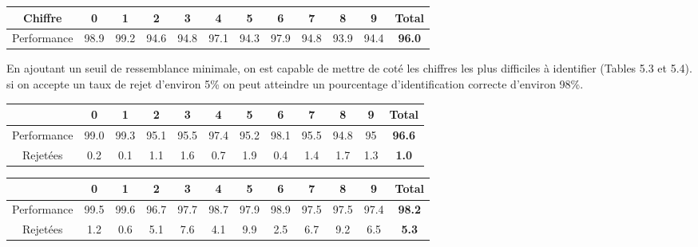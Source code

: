 \documentclass[a4paper,11pt,twoside]{report}
\begin{document}
\begin{center}
\begin{tabular}{ |c||c|c|c|c|c|c|c|c|c|c|c| } 
\hline
 Chiffre & 0 & 1 & 2 & 3 & 4 & 5 & 6 & 7 & 8 & 9 & \textbf{Total} \\ 
  \hline
  \hline
  Performance & 98.9 & 99.2 & 94.6 & 94.8 & 97.1 & 94.3 & 97.9 & 94.8 & 93.9 & 94.4 & \textbf{96.0} \\ 
\hline
\end{tabular}
\end{center}

En ajoutant un seuil de ressemblance minimale, on est capable de mettre de coté les chiffres les plus difficiles à identifier (Tables 5.3 et 5.4). si on accepte un taux de rejet d'environ 5\% on peut atteindre un pourcentage d'identification correcte d'environ 98\%.

\begin{center}
\begin{tabular}{ |c||c|c|c|c|c|c|c|c|c|c|c| } 
 \hline
   & 0 & 1 & 2 & 3 & 4 & 5 & 6 & 7 & 8 & 9 & \textbf{Total} \\ 
  \hline
  \hline
 Performance & 99.0 & 99.3 & 95.1 & 95.5 & 97.4 & 95.2 & 98.1 & 95.5 & 94.8 & 95 &  \textbf{96.6} \\
  \hline
 Rejetées & 0.2 & 0.1 & 1.1 & 1.6 & 0.7 & 1.9 & 0.4 & 1.4 & 1.7 & 1.3 & \textbf{1.0} \\
 \hline
\end{tabular}
\end{center}


\begin{center}
\begin{tabular}{ |c||c|c|c|c|c|c|c|c|c|c|c| } 
 \hline
   & 0 & 1 & 2 & 3 & 4 & 5 & 6 & 7 & 8 & 9 & \textbf{Total} \\ 
  \hline
  \hline
 Performance & 99.5 & 99.6 & 96.7 & 97.7 & 98.7 & 97.9 & 98.9 & 97.5 & 97.5 & 97.4 &  \textbf{98.2} \\
  \hline
 Rejetées & 1.2 & 0.6 & 5.1 & 7.6 & 4.1 & 9.9 & 2.5 & 6.7 & 9.2 & 6.5 & \textbf{5.3} \\
 \hline
\end{tabular}
\end{center}
\end{document}
